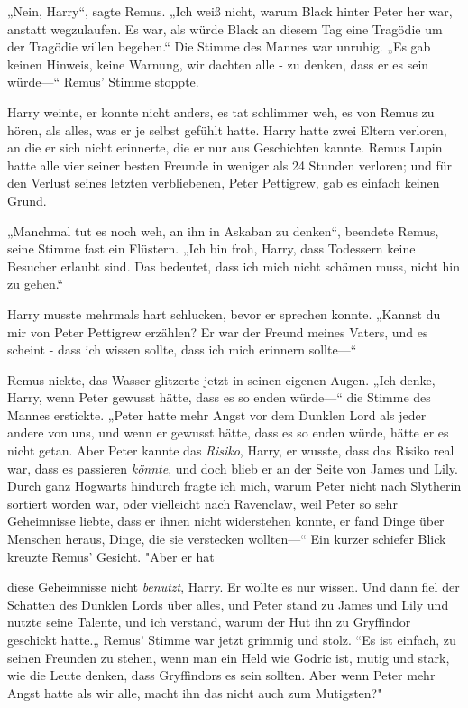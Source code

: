 {„Nein, Harry“, sagte Remus. „Ich weiß nicht, warum Black hinter Peter her war, anstatt wegzulaufen. Es war, als würde Black an diesem Tag eine Tragödie um der Tragödie willen begehen.“ Die Stimme des Mannes war unruhig. „Es gab keinen Hinweis, keine Warnung, wir dachten alle - zu denken, dass er es sein würde—“ Remus' Stimme stoppte.

Harry weinte, er konnte nicht anders, es tat schlimmer weh, es von Remus zu hören, als alles, was er je selbst gefühlt hatte. Harry hatte zwei Eltern verloren, an die er sich nicht erinnerte, die er nur aus Geschichten kannte. Remus Lupin hatte alle vier seiner besten Freunde in weniger als 24 Stunden verloren; und für den Verlust seines letzten verbliebenen, Peter Pettigrew, gab es einfach keinen Grund.

„Manchmal tut es noch weh, an ihn in Askaban zu denken“, beendete Remus, seine Stimme fast ein Flüstern. „Ich bin froh, Harry, dass Todessern keine Besucher erlaubt sind. Das bedeutet, dass ich mich nicht schämen muss, nicht hin zu gehen.“

Harry musste mehrmals hart schlucken, bevor er sprechen konnte. „Kannst du mir von Peter Pettigrew erzählen? Er war der Freund meines Vaters, und es scheint - dass ich wissen sollte, dass ich mich erinnern sollte—“

Remus nickte, das Wasser glitzerte jetzt in seinen eigenen Augen. „Ich denke, Harry, wenn Peter gewusst hätte, dass es so enden würde—“ die Stimme des Mannes erstickte. „Peter hatte mehr Angst vor dem Dunklen Lord als jeder andere von uns, und wenn er gewusst hätte, dass es so enden würde, hätte er es nicht getan. Aber Peter kannte das \emph{Risiko}, Harry, er wusste, dass das Risiko real war, dass es passieren \emph{könnte}, und doch blieb er an der Seite von James und Lily. Durch ganz Hogwarts hindurch fragte ich mich, warum Peter nicht nach Slytherin sortiert worden war, oder vielleicht nach Ravenclaw, weil Peter so sehr Geheimnisse liebte, dass er ihnen nicht widerstehen konnte, er fand Dinge über Menschen heraus, Dinge, die sie verstecken wollten—“ Ein kurzer schiefer Blick kreuzte Remus' Gesicht. "Aber er hat

diese Geheimnisse nicht \emph{benutzt}, Harry. Er wollte es nur wissen. Und dann fiel der Schatten des Dunklen Lords über alles, und Peter stand zu James und Lily und nutzte seine Talente, und ich verstand, warum der Hut ihn zu Gryffindor geschickt hatte.„ Remus' Stimme war jetzt grimmig und stolz. “Es ist einfach, zu seinen Freunden zu stehen, wenn man ein Held wie Godric ist, mutig und stark, wie die Leute denken, dass Gryffindors es sein sollten. Aber wenn Peter mehr Angst hatte als wir alle, macht ihn das nicht auch zum Mutigsten?"

}
